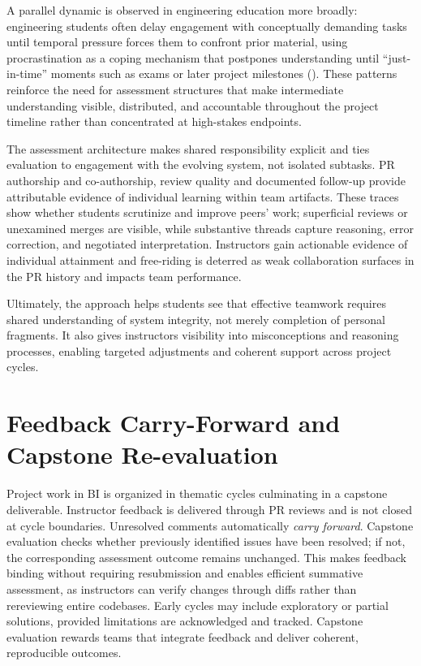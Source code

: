 A parallel dynamic is observed in engineering education more broadly: engineering students often delay engagement with conceptually demanding tasks until temporal pressure forces them to confront prior material, using procrastination as a coping mechanism that postpones understanding until ``just-in-time'' moments such as exams or later project milestones (\cite{wilhelm_procrastination_2023,kim_nembhard_2019}). These patterns reinforce the need for assessment structures that make intermediate understanding visible, distributed, and accountable throughout the project timeline rather than concentrated at high-stakes endpoints.

The assessment architecture makes shared responsibility explicit and ties evaluation to engagement with the evolving system, not isolated subtasks. PR authorship and co-authorship, review quality and documented follow-up provide attributable evidence of individual learning within team artifacts. These traces show whether students scrutinize and improve peers' work; superficial reviews or unexamined merges are visible, while substantive threads capture reasoning, error correction, and negotiated interpretation. Instructors gain actionable evidence of individual attainment and free-riding is deterred as weak collaboration surfaces in the PR history and impacts team performance.

Ultimately, the approach helps students see that effective teamwork requires shared understanding of system integrity, not merely completion of personal fragments. It also gives instructors visibility into misconceptions and reasoning processes, enabling targeted adjustments and coherent support across project cycles.


\section{Feedback Carry-Forward and Capstone Re-evaluation}

Project work in BI is organized in thematic cycles culminating in a capstone deliverable. Instructor feedback is delivered through PR reviews and is not closed at cycle boundaries. Unresolved comments automatically \emph{carry forward}. Capstone evaluation checks whether previously identified issues have been resolved; if not, the corresponding assessment outcome remains unchanged. This makes feedback binding without requiring resubmission and enables efficient summative assessment, as instructors can verify changes through diffs rather than rereviewing entire codebases.
Early cycles may include exploratory or partial solutions, provided limitations are acknowledged and tracked. Capstone evaluation rewards teams that integrate feedback and deliver coherent, reproducible outcomes.

